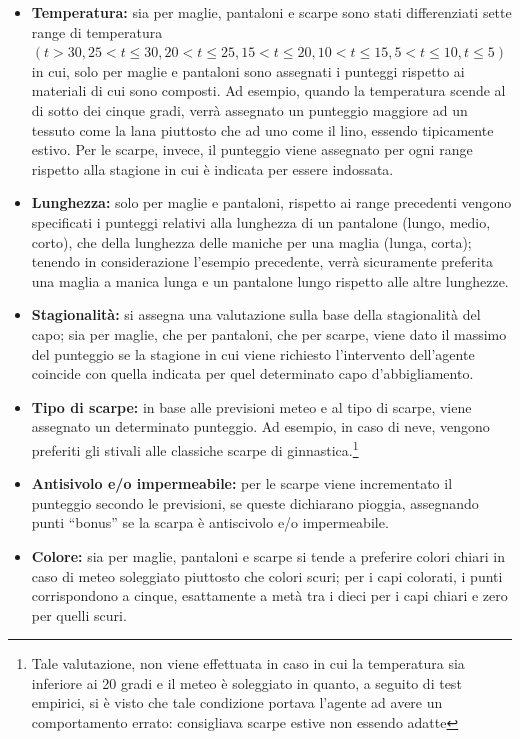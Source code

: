 \documentclass[a4paper, 11pt, oneside]{report}
\begin{document}
            \begin{itemize}
                \item \textbf{Temperatura:} sia per maglie, pantaloni e scarpe sono stati differenziati sette range di temperatura
                $(t>30, 25<t\leq 30, 20<t\leq 25, 15<t\leq 20, 10<t\leq 15, 5<t\leq 10, t\leq 5)$ in cui,
                solo per maglie e pantaloni sono assegnati i punteggi rispetto ai materiali di cui sono composti.
                Ad esempio, quando la temperatura scende al di sotto dei cinque gradi, verrà assegnato un punteggio maggiore ad un tessuto
                come la lana piuttosto che ad uno come il lino, essendo tipicamente estivo.
                Per le scarpe, invece, il punteggio viene assegnato per ogni range rispetto alla stagione in cui è indicata per essere
                indossata.
                \item \textbf{Lunghezza:} solo per maglie e pantaloni, rispetto ai range precedenti vengono specificati i punteggi relativi
                alla lunghezza di un pantalone (lungo, medio, corto), che della lunghezza delle maniche per una maglia (lunga, corta);
                tenendo in considerazione l'esempio precedente, verrà sicuramente preferita una maglia a manica lunga e un pantalone
                lungo rispetto alle altre lunghezze.
                \item \textbf{Stagionalità:} si assegna una valutazione sulla base della stagionalità del capo;
                sia per maglie, che per pantaloni, che per scarpe, viene dato il massimo del punteggio se la stagione in cui viene richiesto l'intervento dell'agente coincide
                con quella indicata per quel determinato capo d'abbigliamento.
                \item \textbf{Tipo di scarpe:} in base alle previsioni meteo e al tipo di scarpe, viene assegnato un determinato punteggio.
                Ad esempio, in caso di neve, vengono preferiti gli stivali alle classiche scarpe di ginnastica.\footnote{Tale valutazione,
                    non viene effettuata in caso in cui la temperatura sia inferiore ai 20 gradi e il meteo è soleggiato
                    in quanto, a seguito di test empirici, si è visto che tale condizione portava l'agente ad avere un comportamento errato: consigliava scarpe estive non essendo adatte}
                \item \textbf{Antisivolo e/o impermeabile:} per le scarpe viene incrementato il
                punteggio secondo le previsioni, se queste dichiarano pioggia, assegnando punti ``bonus'' se la
                scarpa è antiscivolo e/o impermeabile.
                \item \textbf{Colore:} sia per maglie, pantaloni e scarpe si tende a preferire colori chiari in caso di meteo
                soleggiato piuttosto che colori scuri;
                per i capi colorati, i punti corrispondono a cinque, esattamente a metà tra i dieci per i capi chiari e zero per quelli scuri.
            \end{itemize}
\end{document}
